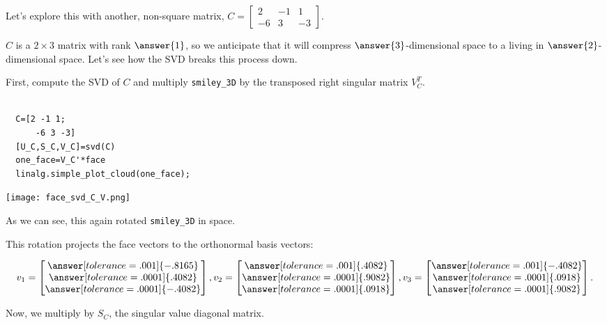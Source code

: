\documentclass{ximera}
\begin{document}
\begin{problem}

Let's explore this with another, non-square matrix, $C=\begin{bmatrix}
  2 & -1 & 1\\
  -6 & 3 & -3
\end{bmatrix}$. 

$C$ is a $2\times 3$ matrix with rank $\answer{1}$, so we anticipate that it will compress $\answer{3}$-dimensional space to a  living in $\answer{2}$-dimensional space. Let's see how the SVD breaks this process down.

First, compute the SVD of $C$ and multiply \texttt{smiley\_3D} by the transposed right singular matrix $V_C^T$.

\begin{verbatim}

  C=[2 -1 1;
      -6 3 -3]
  [U_C,S_C,V_C]=svd(C)
  one_face=V_C'*face
  linalg.simple_plot_cloud(one_face);

\end{verbatim}

\begin{center}
  \texttt{[image: face\_svd\_C\_V.png]}
\end{center}

As we can see, this again rotated \texttt{smiley\_3D} in space.

This rotation projects the face vectors to the orthonormal basis vectors:

$$v_1=\begin{bmatrix}\answer[tolerance=.001]{-.8165}\\\answer[tolerance=.0001]{.4082}\\\answer[tolerance=.0001]{-.4082}\end{bmatrix}, v_2=\begin{bmatrix}\answer[tolerance=.001]{.4082}\\\answer[tolerance=.0001]{.9082}\\\answer[tolerance=.0001]{.0918}\end{bmatrix}, v_3=\begin{bmatrix}\answer[tolerance=.001]{-.4082}\\\answer[tolerance=.0001]{.0918}\\\answer[tolerance=.0001]{.9082}\end{bmatrix}.$$

Now, we multiply by $S_C$, the singular value diagonal matrix.



\end{problem}
\end{document}
